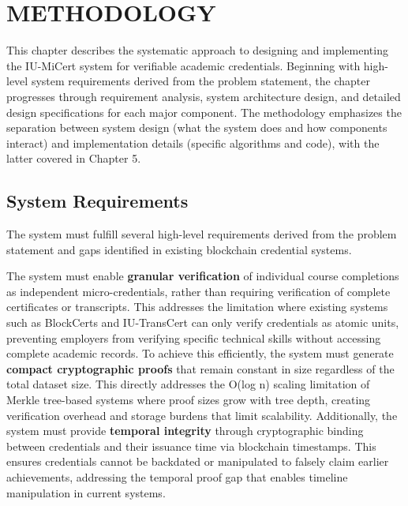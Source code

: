 \chapter{METHODOLOGY}
\label{ch:methodology}

This chapter describes the systematic approach to designing and implementing the IU-MiCert system for verifiable academic credentials. Beginning with high-level system requirements derived from the problem statement, the chapter progresses through requirement analysis, system architecture design, and detailed design specifications for each major component. The methodology emphasizes the separation between system design (what the system does and how components interact) and implementation details (specific algorithms and code), with the latter covered in Chapter 5.

\section{System Requirements}
\label{sec:system-requirements}

The system must fulfill several high-level requirements derived from the problem statement and gaps identified in existing blockchain credential systems.

The system must enable \textbf{granular verification} of individual course completions as independent micro-credentials, rather than requiring verification of complete certificates or transcripts. This addresses the limitation where existing systems such as BlockCerts and IU-TransCert can only verify credentials as atomic units, preventing employers from verifying specific technical skills without accessing complete academic records. To achieve this efficiently, the system must generate \textbf{compact cryptographic proofs} that remain constant in size regardless of the total dataset size. This directly addresses the O(log n) scaling limitation of Merkle tree-based systems where proof sizes grow with tree depth, creating verification overhead and storage burdens that limit scalability. Additionally, the system must provide \textbf{temporal integrity} through cryptographic binding between credentials and their issuance time via blockchain timestamps. This ensures credentials cannot be backdated or manipulated to falsely claim earlier achievements, addressing the temporal proof gap that enables timeline manipulation in current systems.


